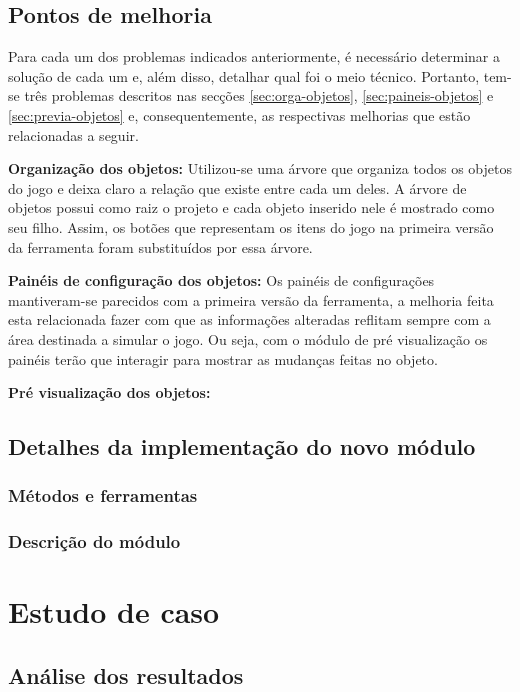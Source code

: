 \documentclass[12pt,twoside,openright,a4paper,english,brazil,sumario=tradicional]{abntex2}
\begin{document}
\section{Pontos de melhoria}
Para cada um dos problemas indicados anteriormente, é necessário determinar a solução de cada um e, além disso, detalhar qual foi o meio técnico. Portanto, tem-se três problemas descritos nas secções \ref{sec:orga-objetos}, \ref{sec:paineis-objetos} e \ref{sec:previa-objetos} e, consequentemente, as respectivas melhorias que estão relacionadas a seguir.

\begin{alineas}
\item \textbf{Organização dos objetos:} Utilizou-se uma árvore que organiza todos os objetos do jogo e deixa claro a relação que existe entre cada um deles. A árvore de objetos possui como raiz o projeto e cada objeto inserido nele é mostrado como seu filho.  Assim, os botões que representam os itens do jogo na primeira versão da ferramenta foram substituídos por essa árvore. %
\item \textbf{Painéis de configuração dos objetos:} Os painéis de configurações mantiveram-se parecidos com a primeira versão da ferramenta, a melhoria feita esta relacionada fazer com que as informações alteradas reflitam sempre com a área destinada a simular o jogo. Ou seja, com o módulo de pré visualização os painéis terão que interagir para mostrar as mudanças feitas no objeto.
\item \textbf{Pré visualização dos objetos:}
\end{alineas}

\section{Detalhes da implementação do novo módulo}
\subsection{Métodos e ferramentas}
\subsection{Descrição do módulo}

\chapter{Estudo de caso}
\label{chap:caso}
\section{Análise dos resultados}
\end{document}

